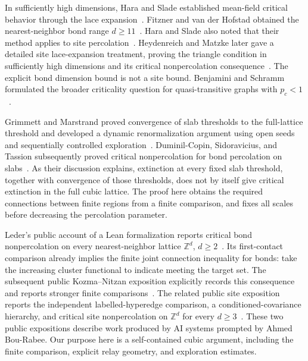 In sufficiently high dimensions, Hara and Slade established mean-field
critical behavior through the lace expansion~\cite{HaraSlade1990}.
Fitzner and van der Hofstad obtained the nearest-neighbor bond range
$d\ge11$~\cite{FitznerHofstad2017}. Hara and Slade also noted that their method applies to site
percolation~\cite[p.~335]{HaraSlade1990}. Heydenreich and Matzke later gave
a detailed site lace-expansion treatment, proving the triangle condition
in sufficiently high dimensions and its critical nonpercolation
consequence~\cite[Theorem~1.1 and Section~1.3]{HeydenreichMatzke2020}. The explicit bond dimension bound is
not a site bound. Benjamini and Schramm formulated the broader criticality
question for quasi-transitive graphs with $p_c<1$~\cite[Conjecture~4]{BenjaminiSchramm1996}.

Grimmett and Marstrand proved convergence of slab thresholds to the
full-lattice threshold and developed a dynamic renormalization argument
using open seeds and sequentially controlled exploration~\cite{GrimmettMarstrand1990}.
Duminil-Copin, Sidoravicius, and Tassion subsequently proved critical
nonpercolation for bond percolation on slabs~\cite{DuminilCopinSidoraviciusTassion2016}.
As their discussion explains, extinction at every fixed slab threshold,
together with convergence of those thresholds, does not by itself give
critical extinction in the full cubic lattice. The proof here obtains the
required connections between finite regions from a finite comparison,
and fixes all scales before decreasing the percolation parameter.

Leder's public account of a Lean formalization reports critical bond
nonpercolation on every nearest-neighbor lattice $\mathbb Z^d$,
$d\ge2$~\cite{Leder2026}. Its first-contact comparison
\cite[Section~3.4, (GEN)]{Leder2026} already implies the finite joint connection inequality for
bonds: take the increasing cluster functional to indicate meeting the
target set. The subsequent public Kozma--Nitzan exposition explicitly
records this consequence and reports stronger finite
comparisons~\cite[``Conjecture~1 from the Lean proof of Conjecture~3'']{KNPublic2026}.
The related public site exposition reports the
independent labelled-hyperedge comparison, a conditioned-covariance
hierarchy, and critical site nonpercolation on $\mathbb Z^d$ for every
$d\ge3$~\cite[``One inequality for both models'',
``Conditional covariance inequalities'', and ``From (1) to the lattice'']{SitePublic2026}.
These two public expositions describe work produced by AI systems
prompted by Ahmed Bou-Rabee. Our purpose here is a
self-contained cubic argument, including the finite comparison, explicit
relay geometry, and exploration estimates.

